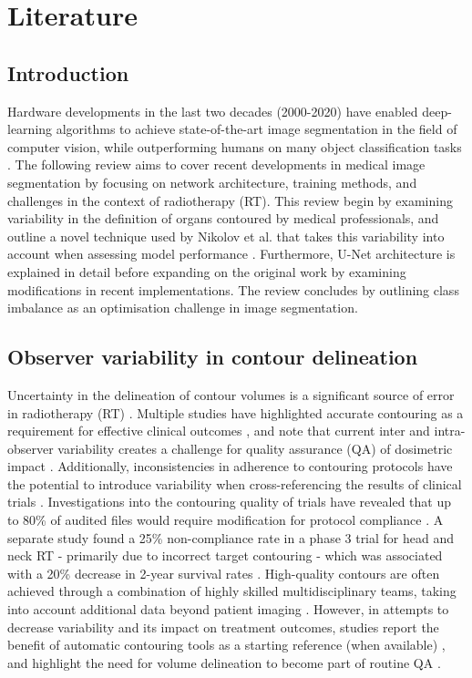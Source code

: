 \chapter{Literature} \label{ch:literature}

\section{Introduction}
Hardware developments in the last two decades (2000-2020) have enabled
deep-learning algorithms to achieve state-of-the-art image segmentation in the
field of computer vision, while outperforming humans on many object
classification tasks \cite{He2015, Wu2015}. The following review aims
to cover recent developments in medical image segmentation by focusing on
network architecture, training methods, and challenges in the context of
radiotherapy (RT). This review begin by examining variability in the definition
of organs contoured by medical professionals, and outline a novel technique used
by Nikolov et al. that takes this variability into account when assessing model
performance \cite{Nikolov_2018}. Furthermore, U-Net architecture is explained in
detail before expanding on the original work by examining modifications in
recent implementations. The review concludes by outlining class imbalance as an
optimisation challenge in image segmentation.


\section{Observer variability in contour delineation}
Uncertainty in the delineation of contour volumes is a significant source of
error in radiotherapy (RT) \cite{Nikolov_2018}. Multiple studies have
highlighted accurate contouring as a requirement for effective clinical outcomes
\cite{Vinod_2016, Roach_2019, Nemoto_2020}, and note that current inter and
intra-observer variability creates a challenge for quality assurance (QA) of
dosimetric impact \cite{Vinod_2016}. Additionally, inconsistencies in adherence
to contouring protocols have the potential to introduce variability when
cross-referencing the results of clinical trials \cite{Roach_2019}.
Investigations into the contouring quality of trials have revealed that up to
80\% of audited files would require modification for protocol compliance
\cite{Kachnic2013}. A separate study found a 25\% non-compliance rate in a phase
3 trial for head and neck RT - primarily due to incorrect target contouring -
which was associated with a 20\% decrease in 2-year survival rates
\cite{Peters2010}. High-quality contours are often achieved through a
combination of highly skilled multidisciplinary teams, taking into account
additional data beyond patient imaging \cite{Vinod_2016, Roach_2019}. However,
in attempts to decrease variability and its impact on treatment outcomes,
studies report the benefit of automatic contouring tools as a starting reference
(when available) \cite{Vinod_2016}, and highlight the need for volume
delineation to become part of routine QA \cite{Vinod_2016}.

